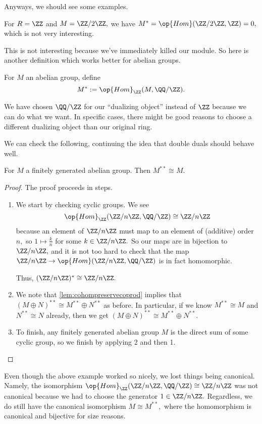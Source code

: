 \documentclass[../notes.tex]{subfiles}
\begin{document}
Anyways, we should see some examples.
\begin{example}
	For $R=\ZZ$ and $M=\ZZ/2\ZZ,$ we have $M^*=\op{Hom}(\ZZ/2\ZZ,\ZZ)=0,$ which is not very interesting.
\end{example}
This is not interesting because we've immediately killed our module. So here is another definition which works better for abelian groups.
\begin{definition}
	For $M$ an abelian group, define
	\[M^*:=\op{Hom}_\ZZ(M,\QQ/\ZZ).\]
\end{definition}
\begin{remark}
	We have chosen $\QQ/\ZZ$ for our ``dualizing object'' instead of $\ZZ$ because we can do what we want. In specific cases, there might be good reasons to choose a different dualizing object than our original ring.
\end{remark}
We can check the following, continuing the idea that double duals should behave well.
\begin{proposition}
	For $M$ a finitely generated abelian group. Then $M^{**}\cong M.$
\end{proposition}
\begin{proof}
	The proof proceeds in steps.
	\begin{enumerate}
		\item We start by checking cyclic groups. We see
		\[\op{Hom}_\ZZ(\ZZ/n\ZZ,\QQ/\ZZ)\cong\ZZ/n\ZZ\]
		because an element of $\ZZ/n\ZZ$ must map to an element of (additive) order $n,$ so $1\mapsto\frac kn$ for some $k\in\ZZ/n\ZZ.$ So our maps are in bijection to $\ZZ/n\ZZ,$ and it is not too hard to check that the map $\ZZ/n\ZZ\to\op{Hom}(\ZZ/n\ZZ,\QQ/\ZZ)$ is in fact homomorphic.

		Thus, $(\ZZ/n\ZZ)^*\cong\ZZ/n\ZZ.$
		\item We note that \autoref{lem:cohompreservecoprod} implies that $(M\oplus N)^{**}\cong M^{**}\oplus N^{**}$ as before. In particular, if we know $M^{**}\cong M$ and $N^{**}\cong N$ already, then we get $(M\oplus N)^{**}\cong M^{**}\oplus N^{**}.$
		\item To finish, any finitely generated abelian group $M$ is the direct sum of some cyclic group, so we finish by applying 2 and then 1.
		\qedhere
	\end{enumerate}
\end{proof}
Even though the above example worked so nicely, we lost things being canonical. Namely, the isomorphism $\op{Hom}_\ZZ(\ZZ/n\ZZ,\QQ/\ZZ)\cong\ZZ/n\ZZ$ was not canonical because we had to choose the generator $1\in\ZZ/n\ZZ.$ Regardless, we do still have the canonical isomorphism $M\cong M^{**},$ where the homomorphism is canonical and bijective for size reasons.
\end{document}
